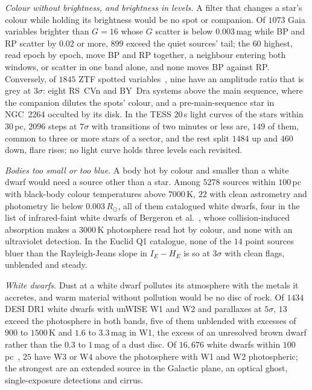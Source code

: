 \documentclass[3p,11pt]{elsarticle}
\begin{document}
\emph{Colour without brightness, and brightness in levels.} A filter that changes a
star's colour while holding its brightness would be no spot or companion. Of $1073$ Gaia
variables brighter than $G=16$ whose $G$ scatter is below $0.003$\,mag while BP and RP
scatter by $0.02$ or more, $899$ exceed the quiet sources' tail; the $60$ highest, read
epoch by epoch, move BP and RP together, a neighbour entering both windows, or scatter in
one band alone, and none moves BP against RP. Conversely, of $1845$ ZTF spotted
variables~\cite{Chen2020}, nine have an amplitude ratio that is grey at $3\sigma$: eight
RS~CVn and BY~Dra systems above the main sequence, where the companion dilutes the spots'
colour, and a pre-main-sequence star in NGC~2264 occulted by its disk. In the TESS $20$\,s light curves
of the stars within $30$\,pc, $2096$ steps at $7\sigma$ with transitions of two minutes or
less are, $149$ of them, common to three or more stars of a sector, and the rest split
$1484$ up and $460$ down, flare rises; no light curve holds three levels each revisited.

\emph{Bodies too small or too blue.} A body hot by colour and smaller than a white dwarf
would need a source other than a star. Among $5278$ sources within $100$\,pc with
black-body colour temperatures above $7000$\,K, $22$ with clean astrometry and photometry
lie below $0.003\,R_\odot$, all of them catalogued white dwarfs, four in the list of
infrared-faint white dwarfs of Bergeron et al.~\cite{Bergeron2022}, whose collision-induced
absorption makes a $3000$\,K photosphere read hot by colour, and none with an ultraviolet
detection. In the Euclid Q1 catalogue, none of the $14$ point sources bluer than the
Rayleigh-Jeans slope in $I_E-H_E$ is so at $3\sigma$ with clean flags, unblended and
steady.

\emph{White dwarfs.} Dust at a white dwarf pollutes its atmosphere with the metals it
accretes, and warm material without pollution would be no disc of rock. Of $1434$ DESI
DR1 white dwarfs with unWISE W1 and W2 and parallaxes at $5\sigma$, $13$ exceed the
photosphere in both bands, five of them unblended with excesses of $900$ to $1500$\,K
and $1.6$ to $3.3$\,mag in W1, the excess of an unresolved brown dwarf rather than the
$0.3$ to $1$\,mag of a dust disc. Of $16{,}676$ white dwarfs within $100$\,pc~\cite{GentileFusillo2021},
$25$ have W3 or W4 above the photosphere with W1 and W2 photospheric; the strongest are an
extended source in the Galactic plane, an optical ghost, single-exposure detections and
cirrus.
\end{document}
